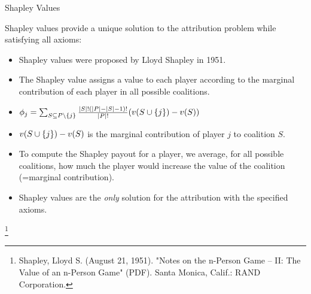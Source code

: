 \documentclass[11pt,compress,t,notes=noshow, aspectratio=169, xcolor=table]{beamer}
\begin{document}
\begin{vbframe}{Shapley Values}

  Shapley values provide a unique solution to the attribution problem while satisfying all axioms:
    \vspace{0.25cm}
\begin{itemize}
  \itemsep1em
  \item Shapley values were proposed by Lloyd Shapley in 1951.
  \item The Shapley value assigns a value to each player according to the marginal contribution of each player in all possible coalitions.
  \item $\phi_j = \sum_{\SsubPnoj} \frac{|S|!(|P| - |S| - 1)!}{|P|!}(v(\Scupj) - v(S))$
  \item $v(\Scupj) - v(S)$ is the marginal contribution of player $j$ to coalition $S$.
  \item To compute the Shapley payout for a player, we average, for all possible coalitions, how much the player would increase the value of the coalition (=marginal contribution).
  \item Shapley values are the \textit{only} solution for the attribution with the specified axioms.
\end{itemize}

\footnote{Shapley, Lloyd S. (August 21, 1951). "Notes on the n-Person Game -- II: The Value of an n-Person Game" (PDF). Santa Monica, Calif.: RAND Corporation.}

\end{vbframe}
\end{document}
